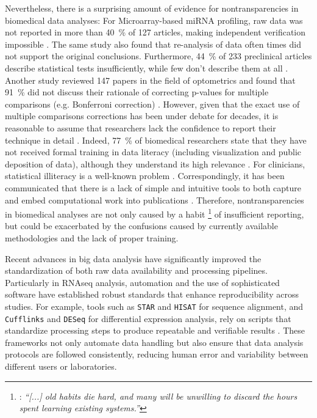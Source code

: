 Nevertheless, there is a surprising amount of evidence for nontransparencies in
biomedical data analyses: For Microarray-based miRNA profiling, raw data was not
reported in more than \SI{40}{\percent} of 127 articles, making independent
verification impossible \cite{witwerDataSubmissionQuality2013}. The same study
also found that re-analysis of data often times did not support the original
conclusions. Furthermore, \SI{44}{\percent} of 233 preclinical articles describe
statistical tests insufficiently, while few don't describe them at all
\cite{gosselinInsufficientTransparencyStatistical2021}. Another study reviewed
147 papers in the field of optometrics and found that \SI{91}{\percent} did not
discuss their rationale of correcting p-values for multiple comparisons (e.g.
Bonferroni correction) \cite{armstrongWhenUseBonferroni2014}. However, given
that the exact use of multiple comparisons corrections has been under debate for
decades, it is reasonable to assume that researchers lack the confidence to
report their technique in detail \cite{pernegerWhatWrongBonferroni1998,
moranArgumentsRejectingSequential2003, sullivanFactsFictionsHandling2021}.
Indeed, \SI{77}{\percent} of biomedical researchers state that they have not
received formal training in data literacy (including visualization and public
deposition of data), although they understand its high relevance
\cite{federerDataLiteracyTraining2016}. For clinicians, statistical illiteracy
is a well-known problem \cite{lakhlifiIllusionKnowledgeStatistics2023}.
Correspondingly, it has been communicated that there is a lack of simple and
intuitive tools to both capture and embed computational work into publications
\cite{mesirovAccessibleReproducibleResearch2010}. Therefore, nontransparencies
in biomedical analyses are not only caused by a habit%
\footnote{%
\citet{pengReproducibleResearchComputational2011}: \textit{ ``[...] old habits
die hard, and many will be unwilling to discard the hours spent learning
existing systems.''} } %
of insufficient reporting, but could be exacerbated by the confusions caused
by currently available methodologies and the lack of proper training.



%
\label{sec:semi_big_data}%
Recent advances in big data analysis have significantly improved the
standardization of both raw data availability and processing pipelines.
Particularly in RNAseq analysis, automation and the use of sophisticated
software have established robust standards that enhance reproducibility across
studies. For example, tools such as \texttt{STAR} and \texttt{HISAT} for
sequence alignment, and \texttt{Cufflinks} and \texttt{DESeq} for differential
expression analysis, rely on scripts that standardize processing steps to
produce repeatable and verifiable results \cite{dobinSTARUltrafastUniversal2013,
kimHISATFastSpliced2015,trapnellDifferentialGeneTranscript2012,loveModeratedEstimationFold2014}.
These frameworks not only automate data handling but also ensure that data
analysis protocols are followed consistently, reducing human error and
variability between different users or laboratories.

